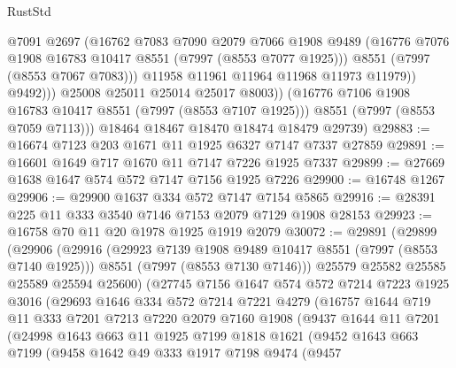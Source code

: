 \begin{lexlean}{RustStd}
\begin{coremodule}
                      @7091
                      @2697
                      (@16762
                        @7083
                        @7090
                        @2079
                        @7066
                        @1908
                        @9489
                        (@16776 @7076 @1908 @16783 @10417 @8551 (@7997 (@8553 @7077 @1925)))
                        @8551
                        (@7997 (@8553 @7067 @7083)))
                      @11958
                      @11961
                      @11964
                      @11968
                      @11973
                      @11979))
                  @9492)))
            @25008
            @25011
            @25014
            @25017
            @8003))
        (@16776 @7106 @1908 @16783 @10417 @8551 (@7997 (@8553 @7107 @1925)))
        @8551
        (@7997 (@8553 @7059 @7113)))
      @18464
      @18467
      @18470
      @18474
      @18479
      @29739)
@29883 := @16674 @7123 @203 @1671 @11 @1925 @6327 @7147 @7337 @27859
@29891 := @16601 @1649 @717 @1670 @11 @7147 @7226 @1925 @7337
@29899 := @27669 @1638 @1647 @574 @572 @7147 @7156 @1925 @7226
@29900 := @16748 @1267
@29906 := @29900 @1637 @334 @572 @7147 @7154 @5865
@29916 := @28391 @225 @11 @333 @3540 @7146 @7153 @2079 @7129 @1908 @28153
@29923 := @16758 @70 @11 @20 @1978 @1925 @1919 @2079
@30072 := @29891
    (@29899
      (@29906
        (@29916
          (@29923 @7139 @1908 @9489 @10417 @8551 (@7997 (@8553 @7140 @1925)))
          @8551
          (@7997 (@8553 @7130 @7146)))
        @25579
        @25582
        @25585
        @25589
        @25594
        @25600)
      (@27745
        @7156
        @1647
        @574
        @572
        @7214
        @7223
        @1925
        @3016
        (@29693
          @1646
          @334
          @572
          @7214
          @7221
          @4279
          (@16757
            @1644
            @719
            @11
            @333
            @7201
            @7213
            @7220
            @2079
            @7160
            @1908
            (@9437
              @1644
              @11
              @7201
              (@24998
                @1643
                @663
                @11
                @1925
                @7199
                @1818
                @1621
                (@9452
                  @1643
                  @663
                  @7199
                  (@9458
                    @1642
                    @49
                    @333
                    @1917
                    @7198
                    @9474
                    (@9457

\end{coremodule}
\end{lexlean}
